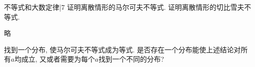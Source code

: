 \newChapter 不等式和大数定律|7
\exer 证明离散情形的马尔可夫不等式.
\exer 证明离散情形的切比雪夫不等式.\par
略

\exer 找到一个分布, 使马尔可夫不等式成为等式. 是否存在一个分布能使上述结论对所有$a$均成立, 又或者需要为每个$a$找到一个不同的分布?